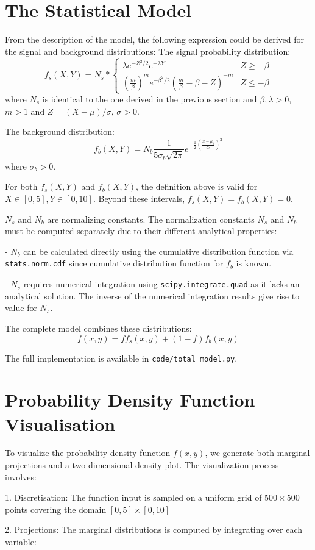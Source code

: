 \documentclass[a4paper, 12pt]{article}
\begin{document}
\section{The Statistical Model}
\hspace{1.5em}From the description of the model, the following expression could be derived for the signal and background distributions:
The signal probability distribution: 
\begin{equation*}
    f_{s}(X,Y) = N_{s} * \begin{cases}
\lambda e^{-Z^2/2} e^{-\lambda Y} & Z \geq -\beta \\
(\frac{m}{\beta})^{m} e^{-\beta^{2}/2}(\frac{m}{\beta} -\beta - Z)^{-m} & Z \leq -\beta 
\end{cases}
\end{equation*}
where $N_{s}$ is identical to the one derived in the previous section and $\beta, \lambda > 0$, $m > 1$ and $Z = (X-\mu)/\sigma$, $\sigma > 0$. \par 
The background distribution:
\begin{equation*}
   f_{b}(X,Y) = N_{b} \frac{1}{5\sigma_{b}\sqrt{2\pi}} e^{-\frac{1}{2}(\frac{x-\mu_{b}}{\sigma_{b}})^2}
\end{equation*}
where $\sigma_{b}>0$. 
\par For both $f_{s}(X,Y)$ and $f_{b}(X,Y)$, the definition above is valid for $X \in [0,5], Y \in [0,10]$. Beyond these intervals, $f_{s}(X,Y) = f_{b}(X,Y) = 0$. 
\par $N_{s}$ and $N_{b}$ are normalizing constants. The normalization constants $N_s$ and $N_b$ must be computed separately due to their different analytical properties:\par
- $N_b$ can be calculated directly using the cumulative distribution function via \texttt{stats.norm.cdf} since cumulative distribution function for $f_{b}$ is known. \par
- $N_s$ requires numerical integration using \texttt{scipy.integrate.quad} as it lacks an analytical solution. The inverse of the numerical integration results give rise to value for $N_s$.
\par 
The complete model combines these distributions:
\begin{equation}
    f(x,y) = f f_s(x,y) + (1-f) f_b(x,y)
\end{equation}

The full implementation is available in \texttt{code/total\_model.py}.


\section{Probability Density Function Visualisation}
\hspace{1.5em}To visualize the probability density function $f(x,y)$, we generate both marginal projections and a two-dimensional density plot. The visualization process involves: \par 
1. Discretisation: The function input is sampled on a uniform grid of $500 \times 500$ points covering the domain $[0,5] \times [0,10]$\par
2. Projections: The marginal distributions is computed by integrating over each variable:
   
\end{document}
